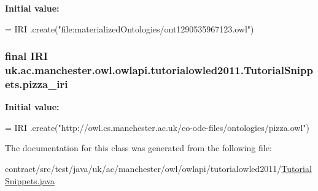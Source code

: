 {\bfseries Initial value\-:}
\begin{DoxyCode}
= IRI
            .create(\textcolor{stringliteral}{"file:materializedOntologies/ont1290535967123.owl"})
\end{DoxyCode}
\hypertarget{classuk_1_1ac_1_1manchester_1_1owl_1_1owlapi_1_1tutorialowled2011_1_1_tutorial_snippets_a9f2596762ef3f1c3438d60fc30715820}{
\subsubsection[{pizza\-\_\-iri}]{\setlength{\rightskip}{0pt plus 5cm}final {\bf I\-R\-I} uk.\-ac.\-manchester.\-owl.\-owlapi.\-tutorialowled2011.\-Tutorial\-Snippets.\-pizza\-\_\-iri\hspace{0.3cm}{\ttfamily [static]}}}\label{classuk_1_1ac_1_1manchester_1_1owl_1_1owlapi_1_1tutorialowled2011_1_1_tutorial_snippets_a9f2596762ef3f1c3438d60fc30715820}
{\bfseries Initial value\-:}
\begin{DoxyCode}
= IRI
            .create(\textcolor{stringliteral}{"http://owl.cs.manchester.ac.uk/co-ode-files/ontologies/pizza.owl"})
\end{DoxyCode}


The documentation for this class was generated from the following file\-:\begin{DoxyCompactItemize}
\item 
contract/src/test/java/uk/ac/manchester/owl/owlapi/tutorialowled2011/\hyperlink{_tutorial_snippets_8java}{Tutorial\-Snippets.\-java}\end{DoxyCompactItemize}
